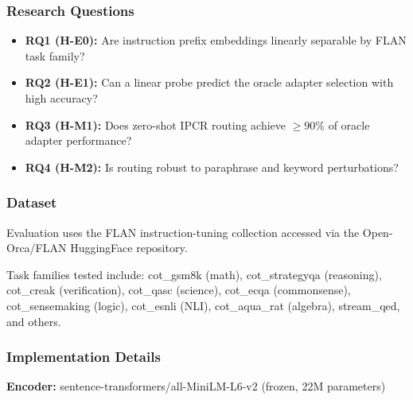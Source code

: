 
\subsubsection{Research Questions}

\begin{itemize}
\item \textbf{RQ1 (H-E0):} Are instruction prefix embeddings linearly separable by FLAN task family?
\item \textbf{RQ2 (H-E1):} Can a linear probe predict the oracle adapter selection with high accuracy?
\item \textbf{RQ3 (H-M1):} Does zero-shot IPCR routing achieve $\geq 90$\% of oracle adapter performance?
\item \textbf{RQ4 (H-M2):} Is routing robust to paraphrase and keyword perturbations?
\end{itemize}

\subsubsection{Dataset}

Evaluation uses the FLAN instruction-tuning collection accessed via the Open-Orca/FLAN HuggingFace repository.

\begin{table}[htbp]
\centering
{}
\end{table}

Task families tested include: cot\_gsm8k (math), cot\_strategyqa (reasoning), cot\_creak (verification), cot\_qasc (science), cot\_ecqa (commonsense), cot\_sensemaking (logic), cot\_esnli (NLI), cot\_aqua\_rat (algebra), stream\_qed, and others.

\subsubsection{Implementation Details}

\textbf{Encoder:} sentence-transformers/all-MiniLM-L6-v2 (frozen, 22M parameters)

